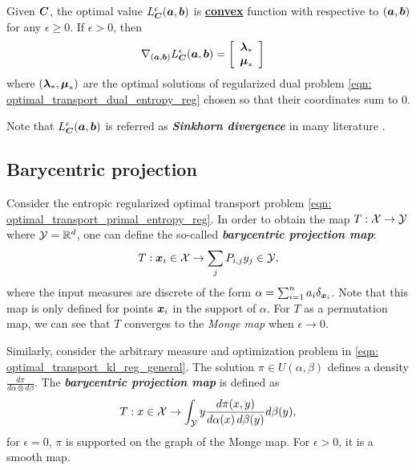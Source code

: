 \documentclass[11pt]{article}
\begin{document}
\begin{proposition}
Given $\boldsymbol{C}$, the optimal value $L_{\boldsymbol{C}}^{\epsilon}(\boldsymbol{a}, \boldsymbol{b})$ is \underline{\textbf{convex}} function with respective to $(\boldsymbol{a}, \boldsymbol{b})$ for any $\epsilon \ge 0$. If $\epsilon >0$, then 
\begin{align}
\nabla_{(\boldsymbol{a}, \boldsymbol{b})}{L_{\boldsymbol{C}}^{\epsilon}(\boldsymbol{a}, \boldsymbol{b})} &= \left[\begin{array}{c}
\boldsymbol{\lambda}_{*} \\
\boldsymbol{\mu}_{*}
\end{array}\right]
\end{align} where $(\boldsymbol{\lambda}_{*}, \boldsymbol{\mu}_{*})$ are the optimal solutions of regularized dual problem \eqref{eqn: optimal_transport_dual_entropy_reg} chosen so that their coordinates sum to $0$.
\end{proposition} Note that $L_{\boldsymbol{C}}^{\epsilon}(\boldsymbol{a}, \boldsymbol{b})$ is referred as \textbf{\emph{Sinkhorn divergence}} in many literature \citep{li2021hilbert}.


\subsection{Barycentric projection}
Consider the entropic regularized optimal transport problem \eqref{eqn: optimal_transport_primal_entropy_reg}. In order to obtain the map $T: {\mathcal X} \rightarrow {\mathcal Y}$ where ${\mathcal Y} = {\mathbb R}^{d}$, one can define the so-called \textbf{\emph{barycentric projection map}}:
\begin{align}
T: \boldsymbol{x}_{i} \in {\mathcal X} \rightarrow \sum_{j}P_{i,j}y_{j} \in {\mathcal Y}, \label{eqn: barycentric_proj}
\end{align} where the input measures are discrete of the form $\alpha = \sum_{i=1}^{n}a_i \delta_{\boldsymbol{x}_{i}}$. Note that this map is only defined for points $\boldsymbol{x}_i$ in the support of $\alpha$. For $T$ as a permutation map, we can see that $T$ converges to the \emph{Monge map} when $\epsilon \rightarrow 0$.

Similarly, consider the arbitrary measure and optimization problem in \eqref{eqn: optimal_transport_kl_reg_general}. The solution $\pi \in U(\alpha, \beta)$ defines a density $\frac{d\pi}{d\alpha \otimes d\beta}$. The \emph{\textbf{barycentric projection map}} is defined as
\begin{align}
T: x \in {\mathcal X} \rightarrow \int_{{\mathcal Y}}y\frac{d\pi(x, y)}{d\alpha(x) \,d\beta(y)} d\beta(y), \label{eqn: barycentric_proj_cont}
\end{align} for $\epsilon = 0$, $\pi$ is supported on the graph of the Monge map. For $\epsilon > 0$, it is a smooth map.
\end{document}
